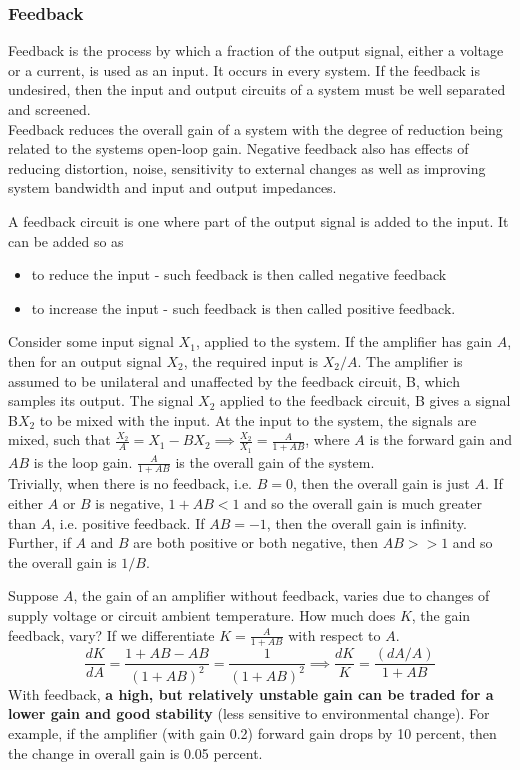 \documentclass[a4paper]{article}
\begin{document}
\subsubsection*{Feedback~\cite{ahmed_spreadbury_1984}}
\begin{defi}[Feedback]
Feedback is the process by which a fraction of the output signal, either a voltage or a current, is used as an input. It occurs in every system. If the feedback is undesired, then the input and output circuits of a system must be well separated and screened.\\[5pt]
Feedback reduces the overall gain of a system with the degree of reduction being related to the systems open-loop gain. Negative feedback also has effects of reducing distortion, noise, sensitivity to external changes as well as improving system bandwidth and input and output impedances.
\end{defi}
\begin{defi}
A feedback circuit is one where part of the output signal is added to the input. It can be added so as
\begin{itemize}
    \item to reduce the input - such feedback is then called negative feedback
    \item to increase the input - such feedback is then called positive feedback.
\end{itemize}
Consider some input signal $X_1$, applied to the system. If the amplifier has gain $A$, then for an output signal $X_2$, the required input is $X_2/A$. The amplifier is assumed to be unilateral and unaffected by the feedback circuit, B, which samples its output. The signal $X_2$ applied to the feedback circuit, B gives a signal B$X_2$ to be mixed with the input. At the input to the system, the signals are mixed, such that $\frac{X_2}{A}=X_1-BX_2\implies \frac{X_2}{X_1}=\frac{A}{1+AB}$, where $A$ is the forward gain and $AB$ is the loop gain. $\frac{A}{1+AB}$ is the overall gain of the system.\\[5pt]
Trivially, when there is no feedback, i.e. $B=0$, then the overall gain is just $A$. If either $A$ or $B$ is negative, $1+AB<1$ and so the overall gain is much greater than $A$, i.e. positive feedback. If $AB=-1$, then the overall gain is infinity. Further, if $A$ and $B$ are both positive or both negative, then $AB>>1$ and so the overall gain is $1/B$.
\end{defi}
\begin{Note}
Suppose $A$, the gain of an amplifier without feedback, varies due to changes of supply voltage or circuit ambient temperature. How much does $K$, the gain feedback, vary? If we differentiate $K=\frac{A}{1+AB}$ with respect to $A$.
$$\frac{dK}{dA}=\frac{1+AB-AB}{(1+AB)^2}=\frac{1}{(1+AB)^2}\implies\frac{dK}{K}=\frac{(dA/A)}{1+AB}$$
With feedback, \textbf{a high, but relatively unstable gain can be traded for a lower gain and good stability} (less sensitive to environmental change). For example, if the amplifier (with gain 0.2) forward gain drops by 10 percent, then the change in overall gain is 0.05 percent.
\end{Note}
\end{document}
